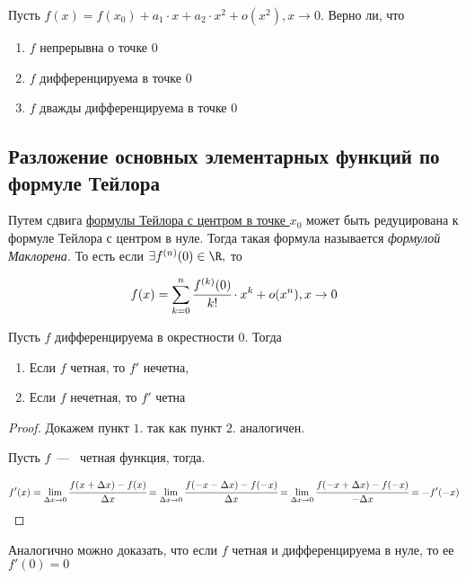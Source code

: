 \begin{problem}
	Пусть $f(x) = f(x_{0}) + a_{1}\cdot x + a_{2}\cdot x^{2} + o(x^{2}), x \to 0.$ Верно ли, что \begin{enumerate}
		\item $f$ непрерывна о точке $0$
		\item $f$ дифференцируема в точке $0$
		\item $f$ дважды дифференцируема в точке $0$
	\end{enumerate}
\end{problem}

\subsection{Разложение основных элементарных функций по формуле Тейлора}
\begin{definition}
	Путем сдвига \hyperlink{def5.13}{формулы Тейлора с центром в точке $x_{0}$} может быть редуцирована к формуле Тейлора с центром в нуле. Тогда такая формула называется \textit{формулой Маклорена.}  То есть если $\exists f^{(n) }(0) \in \R,$ то 
	
	$$f(x) = \sum\limits_{k = 0}^{n} \cfrac{f^{(k)}(0)}{k!} \cdot x^{k} + o(x^{n}), x \to 0$$
\end{definition}

\begin{lemma}
	Пусть $f$ дифференцируема в окрестности 0. Тогда
	\begin{enumerate}
		\item Если $f$ четная, то $f'$ нечетна,
		\item Если $f$ нечетная, то $f'$ четна
	\end{enumerate}
\end{lemma}
\begin{proof}
	Докажем пункт $1.$ так как пункт $2.$ аналогичен.
	
	Пусть $f$~---~ четная функция, тогда.
	
	$$f'(x) = \lim\limits_{\Delta x\to 0} \cfrac{f(x+\Delta x) - f(x)}{\Delta x} = \lim\limits_{\Delta x \to 0} \cfrac{f(-x-\Delta x) - f(-x)}{\Delta x} =\lim\limits_{\Delta x \to 0} \cfrac{f(-x +\Delta x) - f(-x)}{-\Delta x} = -f'(-x)$$
\end{proof}

\begin{note}
	Аналогично можно доказать, что если $f$ четная и дифференцируема в нуле, то ее $f'(0) = 0$
\end{note}

